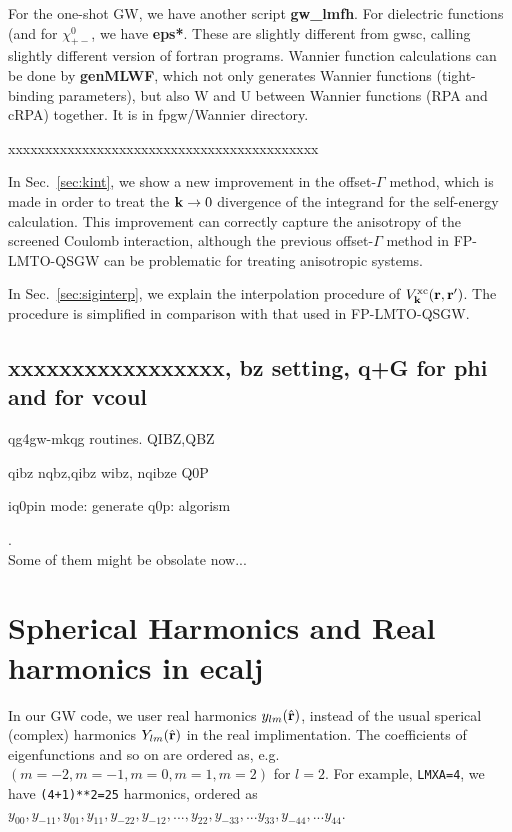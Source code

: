 \documentclass[a4paper,10pt,epsf,fleqn]{article}
\def\vxc{V^{\rm xc}}
\newcommand{\bfk}{{\bf k}}
\newcommand{\bfr}{{\bf r}}
\newcommand{\exe}[1]{{\bf #1}}
\newcommand{\io}[1]{{\sf  #1}}
\begin{document}
For the one-shot GW, we have another script \exe{gw\_lmfh}.
For dielectric functions (and for $\chi_{+-}^0$, we have \exe{eps*}.
These are slightly different from gwsc, calling
slightly different version of fortran programs.
Wannier function calculations can be done by \exe{genMLWF},
which not only generates Wannier functions (tight-binding parameters), 
but also W and U between Wannier functions (RPA and cRPA) together. 
It is in \io{fpgw/Wannier} directory.


xxxxxxxxxxxxxxxxxxxxxxxxxxxxxxxxxxxxxxxxxx


In Sec.~\ref{sec:kint}, we show a new improvement in the offset-$\Gamma$ method, which is
made in order to treat the $\bfk \to 0$ divergence of the integrand for the self-energy calculation.
This improvement can correctly capture the anisotropy of the screened Coulomb interaction,
although the previous offset-$\Gamma$ method in FP-LMTO-QSGW \cite{kotani_quasiparticle_2007}
can be problematic for treating anisotropic systems.

In Sec.~\ref{sec:siginterp}, we explain the interpolation procedure of 
$\vxc_\bfk(\bfr,\bfr')$. The procedure is simplified in comparison with that used in FP-LMTO-QSGW.






\subsection{xxxxxxxxxxxxxxxxx, bz setting, q+G for phi and for vcoul}
qg4gw-mkqg routines.
QIBZ,QBZ 

qibz nqbz,qibz wibz, 
nqibze Q0P

iq0pin mode:
generate q0p: algorism


\newpage
\appendix
{}.  \\Some of them might be obsolate now...


\section{Spherical Harmonics and Real harmonics in ecalj}

In our GW code, we user real harmonics $y_{lm}(\hat{\bf r})$,
instead of the usual sperical (complex) harmonics $Y_{lm}(\hat{\bf r})$
in the real implimentation.
The coefficients of eigenfunctions and so on are ordered as, e.g.
$(m=-2, m=-1, m=0, m=1,m=2)$ for $l=2$.
For example, \verb#LMXA=4#, we have \verb#(4+1)**2=25# harmonics,
ordered as
$y_{00},y_{-11},y_{01},y_{11},y_{-22},y_{-12},... ,y_{22},y_{-33},...y_{33},
y_{-44},...y_{44}$.
\end{document}
